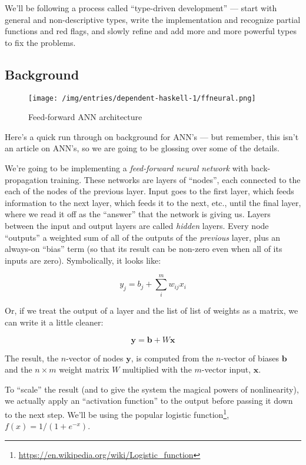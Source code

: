 \documentclass[]{article}
\renewcommand{\href}[2]{#2\footnote{\url{#1}}}
\begin{document}
We'll be following a process called ``type-driven development'' --- start with
general and non-descriptive types, write the implementation and recognize
partial functions and red flags, and slowly refine and add more and more
powerful types to fix the problems.

\hypertarget{background}{%
\subsection{Background}\label{background}}

\begin{figure}
\centering
\texttt{[image: /img/entries/dependent-haskell-1/ffneural.png]}
\caption{Feed-forward ANN architecture}
\end{figure}

Here's a quick run through on background for ANN's --- but remember, this isn't
an article on ANN's, so we are going to be glossing over some of the details.

We're going to be implementing a \emph{feed-forward neural network} with
back-propagation training. These networks are layers of ``nodes'', each
connected to the each of the nodes of the previous layer. Input goes to the
first layer, which feeds information to the next layer, which feeds it to the
next, etc., until the final layer, where we read it off as the ``answer'' that
the network is giving us. Layers between the input and output layers are called
\emph{hidden} layers. Every node ``outputs'' a weighted sum of all of the
outputs of the \emph{previous} layer, plus an always-on ``bias'' term (so that
its result can be non-zero even when all of its inputs are zero). Symbolically,
it looks like:

\[
y_j = b_j + \sum_i^m w_{ij} x_i
\]

Or, if we treat the output of a layer and the list of list of weights as a
matrix, we can write it a little cleaner:

\[
\mathbf{y} = \mathbf{b} + W \mathbf{x}
\]

The result, the \(n\)-vector of nodes \(\mathbf{y}\), is computed from the
\(n\)-vector of biases \(\mathbf{b}\) and the \(n \times m\) weight matrix \(W\)
multiplied with the \(m\)-vector input, \(\mathbf{x}\).

To ``scale'' the result (and to give the system the magical powers of
nonlinearity), we actually apply an ``activation function'' to the output before
passing it down to the next step. We'll be using the popular
\href{https://en.wikipedia.org/wiki/Logistic_function}{logistic function},
\(f(x) = 1 / (1 + e^{-x})\).
\end{document}
